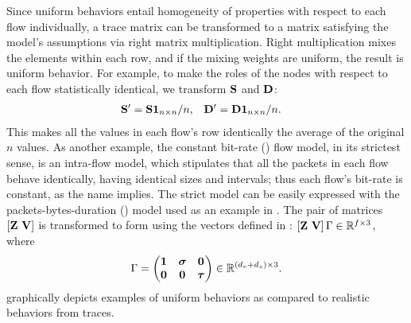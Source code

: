 \documentclass[twocolumn,final]{svjour3}
\begin{document}
Since uniform behaviors entail homogeneity of properties with respect to each flow individually, a trace matrix can be transformed to a matrix satisfying the model's assumptions via right matrix multiplication. Right multiplication mixes the elements within each row, and if the mixing weights are uniform, the result is uniform behavior. For example, to make the roles of the nodes with respect to each flow statistically identical, we transform $\mathbf{S}$ and $\mathbf{D}$:
\begin{align*}
\mathbf{S}' &= \mathbf{S}\mathbf{1}_{n \times n}/n, & \mathbf{D}' &= \mathbf{D}\mathbf{1}_{n \times n}/n.
\end{align*}
This makes all the values in each flow's row identically the average of the original $n$ values. As another example, the constant bit-rate () flow model, in its strictest sense, is an intra-flow model, which stipulates that all the packets in each flow behave identically, having identical sizes and intervals; thus each flow's bit-rate is constant, as the name implies. The strict  model can be easily expressed with the packets-bytes-duration () model used as an example in . The pair of matrices $[\mathbf{Z}~\mathbf{V}]$ is transformed to  form using the vectors defined in : $[\mathbf{Z}~\mathbf{V}]\,\Gamma\in\mathbb{R}^{f \times 3}$, where
\begin{align}
\Gamma=\begin{pmatrix}
\ones{} & \vec{\sigma} & \zeros{} \\
\zeros{} & \zeros{} & \vec{\tau}
\end{pmatrix} \in \R^{(d_v+d_z)\times{3}}.
\end{align}
 graphically depicts examples of uniform behaviors as compared to realistic behaviors from traces.

\end{document}
